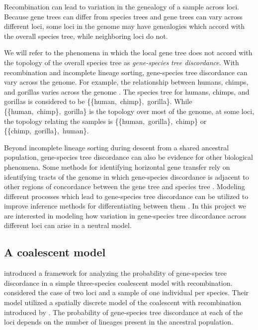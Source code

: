 \documentclass[11pt,oneside]{amsart}
\begin{document}
Recombination can lead to variation in the genealogy of a sample across loci. Because gene trees can differ from species trees and gene trees can vary across different loci, some loci in the genome may have genealogies which accord with the overall species tree, while neighboring loci do not. 

We will refer to the phenomena in which the local gene tree does not accord with the topology of the overall species tree as \textit{gene-species tree discordance}. With recombination and incomplete lineage sorting, gene-species tree discordance can vary across the genome. For example, the relationship between humans, chimps, and gorillas varies across the genome \citep{Dutheiletal2009}. The species tree for humans, chimps, and gorillas is considered to be \mbox{\{\{human, chimp\}, gorilla\}}. While \mbox{\{\{human, chimp\}, gorilla\}} is the topology over most of the genome, at some loci, the topology relating the samples is \mbox{\{\{human, gorilla\}, chimp\}} or \mbox{\{\{chimp, gorilla\}, human\}}.

Beyond incomplete lineage sorting during descent from a shared ancestral population, gene-species tree discordance can also be evidence for other biological phenomena. Some methods for identifying horizontal gene transfer rely on identifying tracts of the genome in which gene-species discordance is adjacent to other regions of concordance between the gene tree and species tree \citep{Ochman2001}. Modeling different processes which lead to gene-species tree discordance can be utilized to improve inference methods for differentiating between them \citep{RuthsNakleh2005}. In this project we are interested in modeling how variation in gene-species tree discordance across different loci can arise in a neutral model.

\subsection{A coalescent model}
\label{subsection: a coalescent model}

\cite{SlatkinPollack2006} introduced a framework for analyzing the probability of gene-species tree discordance in a simple three-species coalescent model with recombination. \cite{SlatkinPollack2006} considered the case of two loci and a sample of one individual per species. Their model utilized a spatially discrete model of the coalescent with recombination introduced by \cite{SimonsenChurchill1997}. The probability of gene-species tree discordance at each of the loci depends on the number of lineages present in the ancestral population.%
\end{document}
